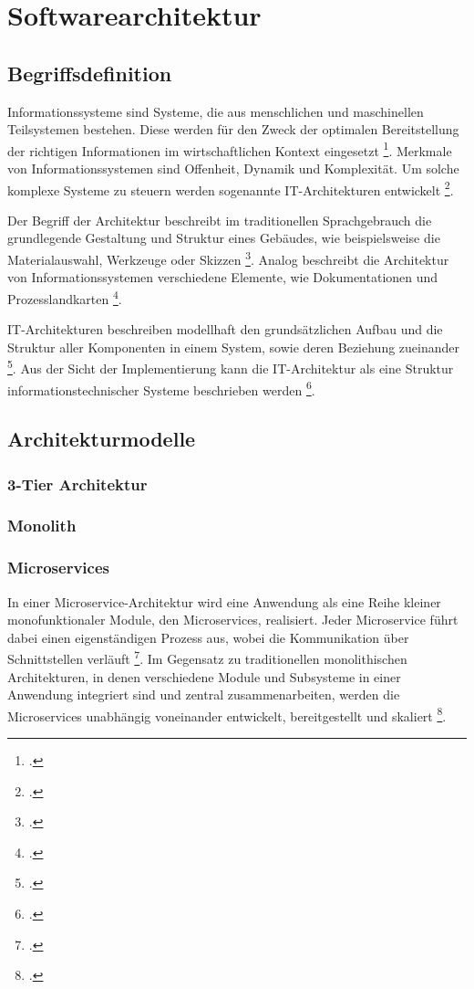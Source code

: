 \newpage
\section{Softwarearchitektur}
\subsection{Begriffsdefinition}

Informationssysteme sind Systeme, die aus menschlichen und maschinellen Teilsystemen bestehen. Diese werden für den Zweck der optimalen Bereitstellung der richtigen Informationen im wirtschaftlichen Kontext eingesetzt \footcite[Vgl.][S.8]{becker2011}. Merkmale von Informationssystemen sind Offenheit, Dynamik und Komplexität. Um solche komplexe Systeme zu steuern werden sogenannte IT-Architekturen entwickelt \footcite[Vgl.][S.11]{becker2011}.

Der Begriff der Architektur beschreibt im traditionellen Sprachgebrauch die grundlegende Gestaltung und Struktur eines Gebäudes, wie beispielsweise die Materialauswahl, Werkzeuge oder Skizzen \footcite[Vgl.][S.16]{schuetz2017}. Analog beschreibt die Architektur von Informationssystemen verschiedene Elemente, wie Dokumentationen und Prozesslandkarten \footcite[Vgl.][S.17]{schuetz2017}.

IT-Architekturen beschreiben modellhaft den grundsätzlichen Aufbau und die Struktur aller Komponenten in einem System, sowie deren Beziehung zueinander \footcite[Vgl.][S.889]{knoll2018}. Aus der Sicht der Implementierung kann die IT-Architektur als eine Struktur informationstechnischer Systeme beschrieben werden \footcite[Vgl.][S.890]{knoll2018}.



\subsection{Architekturmodelle}
\subsubsection{3-Tier Architektur}
\subsubsection{Monolith}
\subsubsection{Microservices}


In einer Microservice-Architektur wird eine Anwendung als eine Reihe kleiner monofunktionaler Module, den Microservices, realisiert. Jeder Microservice führt dabei einen eigenständigen Prozess aus, wobei die Kommunikation über Schnittstellen verläuft \footcite[Vgl.][S.1]{filho2021}. Im Gegensatz zu traditionellen monolithischen Architekturen, in denen verschiedene Module und Subsysteme in einer Anwendung integriert sind und zentral zusammenarbeiten, werden die Microservices unabhängig voneinander entwickelt, bereitgestellt und skaliert \footcite[Vgl.][S.1]{laigner2021}.

